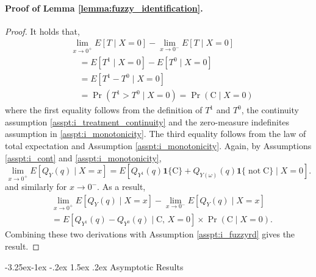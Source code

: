 \documentclass[12pt]{article}
\makeatletter
\renewcommand\subsection{\@startsection{subsection}{2}{\z@}%
  {-3.25ex\@plus -1ex \@minus -.2ex}%
  {1.5ex \@plus .2ex}%
  {\itshape\large\center}} %
\makeatother
\begin{document}
\paragraph{Proof of Lemma \ref{lemma:fuzzy_identification}.}
\begin{proof}
It holds that,
$$
\begin{aligned}
& \lim _{x \rightarrow 0^{+}} E[T \mid X=0]-\lim _{x \rightarrow 0^-} E[T \mid X=0] \\
& \quad=E\left[T^1 \mid X=0\right]-E\left[T^0 \mid X=0\right] \\
& \quad=E\left[T^1-T^0 \mid X=0\right] \\
& \quad=\operatorname{Pr}\left(T^1>T^0 \mid X=0\right)=\operatorname{Pr}\left(\mathrm{C} \mid X=0\right)
\end{aligned}
$$
where the first equality follows from the definition of $T^1$ and $T^0$, the continuity assumption \ref{asspt:i_treatment_continuity} and the zero-measure indefinites assumption in \ref{asspt:i_monotonicity}. The third equality follows from the law of total expectation and Assumption \ref{asspt:i_monotonicity}. Again, by Assumptions \ref{asspt:i_cont} and \ref{asspt:i_monotonicity},
$$
\lim _{x \rightarrow 0^{+}} E\left[Q_Y(q) \mid X=x\right]=E\left[Q_{Y^1}(q) \mathbf{1}\{\mathrm{C}\}+Q_{Y(\omega)}(q) \mathbf{1}\{\operatorname{not} \mathrm{C}\} \mid X=0\right] .
$$
and similarly for $x \to 0^-$. As a result,
\begin{align*}
& \lim _{x \rightarrow 0^{+}} E\left[Q_Y(q) \mid X=x\right]-\lim _{x \rightarrow 0^{-}} E\left[Q_Y(q) \mid X=x\right] \\
& = 
E\left[Q_{Y^1}(q)-Q_{Y^0}(q) \mid \text {C}, \, X=0\right] \times \operatorname{Pr}\left(\mathrm{C} \mid X=0\right).
\end{align*}
Combining these two derivations with Assumption \ref{asspt:i_fuzzyrd} gives the result. 
\end{proof}
\subsection{Asymptotic Results}
\end{document}
